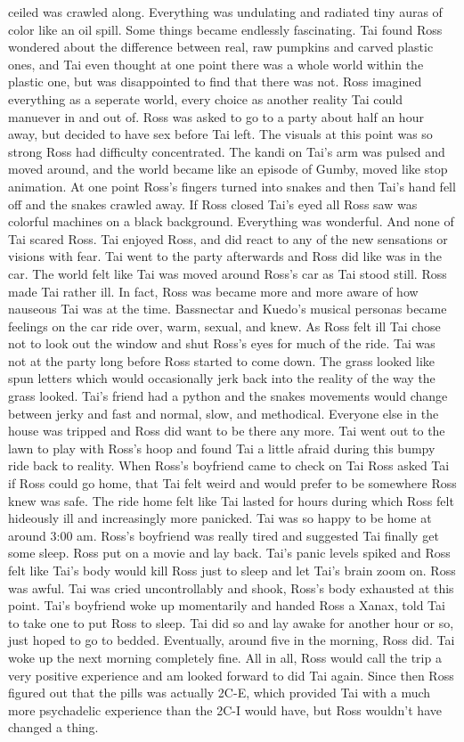 \documentclass[12pt]{book}
\begin{document}
ceiled was crawled along. Everything was undulating and radiated tiny auras of color like an oil spill. Some things became endlessly fascinating. Tai found Ross wondered about the difference between real, raw pumpkins and carved plastic ones, and Tai even thought at one point there was a whole world within the plastic one, but was disappointed to find that there was not. Ross imagined everything as a seperate world, every choice as another reality Tai could manuever in and out of. Ross was asked to go to a party about half an hour away, but decided to have sex before Tai left. The visuals at this point was so strong Ross had difficulty concentrated. The kandi on Tai's arm was pulsed and moved around, and the world became like an episode of Gumby, moved like stop animation. At one point Ross's fingers turned into snakes and then Tai's hand fell off and the snakes crawled away. If Ross closed Tai's eyed all Ross saw was colorful machines on a black background. Everything was wonderful. And none of Tai scared Ross. Tai enjoyed Ross, and did react to any of the new sensations or visions with fear. Tai went to the party afterwards and Ross did like was in the car. The world felt like Tai was moved around Ross's car as Tai stood still. Ross made Tai rather ill. In fact, Ross was became more and more aware of how nauseous Tai was at the time. Bassnectar and Kuedo's musical personas became feelings on the car ride over, warm, sexual, and knew. As Ross felt ill Tai chose not to look out the window and shut Ross's eyes for much of the ride. Tai was not at the party long before Ross started to come down. The grass looked like spun letters which would occasionally jerk back into the reality of the way the grass looked. Tai's friend had a python and the snakes movements would change between jerky and fast and normal, slow, and methodical. Everyone else in the house was tripped and Ross did want to be there any more. Tai went out to the lawn to play with Ross's hoop and found Tai a little afraid during this bumpy ride back to reality. When Ross's boyfriend came to check on Tai Ross asked Tai if Ross could go home, that Tai felt weird and would prefer to be somewhere Ross knew was safe. The ride home felt like Tai lasted for hours during which Ross felt hideously ill and increasingly more panicked. Tai was so happy to be home at around 3:00 am. Ross's boyfriend was really tired and suggested Tai finally get some sleep. Ross put on a movie and lay back. Tai's panic levels spiked and Ross felt like Tai's body would kill Ross just to sleep and let Tai's brain zoom on. Ross was awful. Tai was cried uncontrollably and shook, Ross's body exhausted at this point. Tai's boyfriend woke up momentarily and handed Ross a Xanax, told Tai to take one to put Ross to sleep. Tai did so and lay awake for another hour or so, just hoped to go to bedded. Eventually, around five in the morning, Ross did. Tai woke up the next morning completely fine. All in all, Ross would call the trip a very positive experience and am looked forward to did Tai again. Since then Ross figured out that the pills was actually 2C-E, which provided Tai with a much more psychadelic experience than the 2C-I would have, but Ross wouldn't have changed a thing.
\end{document}
